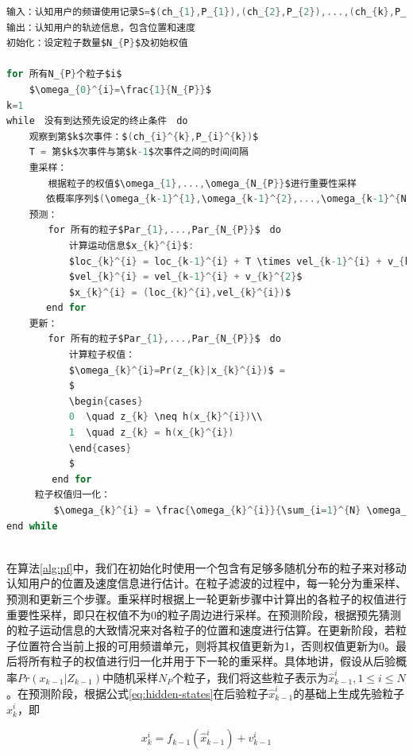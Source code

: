 \begin{lstlisting}[language={C}, caption={基于粒子滤波的移动用户轨迹跟踪算法}]
输入：认知用户的频谱使用记录S=$(ch_{1},P_{1}),(ch_{2},P_{2}),...,(ch_{k},P_{k})$
输出：认知用户的轨迹信息，包含位置和速度
初始化：设定粒子数量$N_{P}$及初始权值
　　　　
for 所有N_{P}个粒子$i$
    $\omega_{0}^{i}=\frac{1}{N_{P}}$
k=1
while　没有到达预先设定的终止条件　do
    观察到第$k$次事件：$(ch_{i}^{k},P_{i}^{k})$
    T = 第$k$次事件与第$k-1$次事件之间的时间间隔
    重采样：
    　　根据粒子的权值$\omega_{1},...,\omega_{N_{P}}$进行重要性采样
       依概率序列$(\omega_{k-1}^{1},\omega_{k-1}^{2},...,\omega_{k-1}^{N_{P}})$从粒子序列中采样，重复$N_{P}$次
    预测：
    　　for 所有的粒子$Par_{1},...,Par_{N_{P}}$　do
           计算运动信息$x_{k}^{i}$:
           $loc_{k}^{i} = loc_{k-1}^{i} + T \times vel_{k-1}^{i} + v_{k}^{1}$
           $vel_{k}^{i} = vel_{k-1}^{i} + v_{k}^{2}$
           $x_{k}^{i} = (loc_{k}^{i},vel_{k}^{i})$
       end for
    更新：
    　　for 所有的粒子$Par_{1},...,Par_{N_{P}}$　do
           计算粒子权值：
           $\omega_{k}^{i}=Pr(z_{k}|x_{k}^{i})$ = 
           $
           \begin{cases}
           0  \quad z_{k} \neq h(x_{k}^{i})\\
           1  \quad z_{k} = h(x_{k}^{i})
           \end{cases}
           $  
        end for
     粒子权值归一化：
     　　$\omega_{k}^{i} = \frac{\omega_{k}^{i}}{\sum_{i=1}^{N} \omega_{k}^{i}}$
end while
              
\end{lstlisting}\label{alg:pf}

在算法\ref{alg:pf}中，我们在初始化时使用一个包含有足够多随机分布的粒子来对移动认知用户的位置及速度信息进行估计。在粒子滤波的过程中，每一轮分为重采样、预测和更新三个步骤。重采样时根据上一轮更新步骤中计算出的各粒子的权值进行重要性采样，即只在权值不为0的粒子周边进行采样。在预测阶段，根据预先猜测的粒子运动信息的大致情况来对各粒子的位置和速度进行估算。在更新阶段，若粒子位置符合当前上报的可用频谱单元，则将其权值更新为1，否则权值更新为0。最后将所有粒子的权值进行归一化并用于下一轮的重采样。具体地讲，假设从后验概率$Pr(x_{k-1}|Z_{k-1})$中随机采样$N_{P}$个粒子，我们将这些粒子表示为$\hat{x}_{k-1}^{i},1 \leq i \leq N$。在预测阶段，根据公式\ref{eq:hidden-states}在后验粒子$\hat{x}_{k-1}^{i}$的基础上生成先验粒子$x_{k}^{i}$，即

\begin{equation}
x_{k}^{i} = f_{k-1}(\hat{x}_{k-1}^{i}) + v_{k-1}^{i}
\end{equation}

